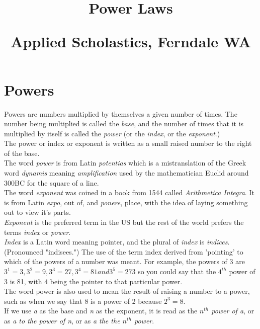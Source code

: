 \documentclass{article}
\author{}
\date{}
\title{Power Laws\\
\vspace{28pt}
\begin{normalsize}Applied Scholastics, Ferndale WA \end{normalsize}}
\begin{document}
\maketitle
\pagebreak
\tableofcontents
\pagebreak

\section{Powers}
Powers are numbers multiplied by themselves a given number of times. The number being multiplied is called the \textit{base}, and the number of times that it is multiplied by itself is called the \textit{power} (or the \textit{index}, or the \textit{exponent}.)\\

The power or index or exponent is written as a small raised number to the right of the base.\\

The word \textit{power} is from Latin \textit{potentias} which is a mistranslation of the Greek word \textit{dynamis} meaning \textit{amplification} used by the mathematician Euclid around 300BC for the square of a line.\\

The word \textit{exponent} was coined in a book from 1544 called \textit{Arithmetica Integra}. It is from Latin \textit{expo}, out of, and \textit{ponere}, place, with the idea of laying something out to view it's parts.\\

\textit{Exponent} is the preferred term in the US but the rest of the world prefers the terms \textit{index} or \textit{power}.\\

\textit{Index} is a Latin word meaning pointer, and the plural of \textit{index} is \textit{indices}. (Pronounced "indisees.") The use of the term index derived from 'pointing' to which of the powers of a number was meant. For example, the powers of 3 are $3^1=3, 3^2=9, 3^3=27, 3^4=81 and 3^5=273$ so you could say that the $4^{th}$ power of 3 is 81, with 4 being the pointer to that particular power.\\

The word power is also used to mean the result of raising a number to a power, such as when we say that 8 is a power of 2 because $2^3=8$.\\

If we use \textit{a} as the base and \textit{n} as the exponent, it is read as the \textit{$n^{th}$ power of a}, or as \textit{a to the power of n}, or as \textit{a the the $n^{th}$ power}.\\
\end{document}

